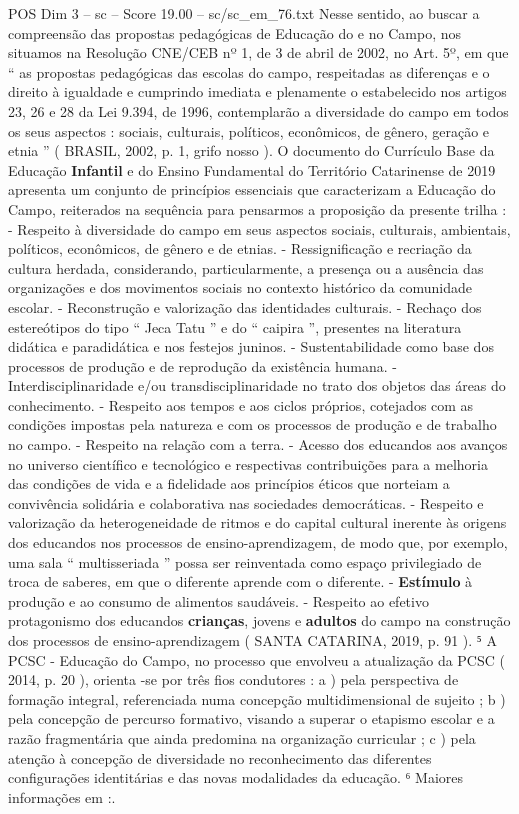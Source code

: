 \begin{textsample}{POS Dim 3 – sc – Score 19.00 – sc/sc\_em\_76.txt}
Nesse sentido, ao buscar a compreensão das propostas pedagógicas de Educação do e no Campo, nos situamos na Resolução CNE/CEB nº 1, de 3 de abril de 2002, no Art. 5º, em que “ as propostas pedagógicas das escolas do campo, respeitadas as diferenças e o direito à igualdade e cumprindo imediata e plenamente o estabelecido nos artigos 23, 26 e 28 da Lei 9.394, de 1996, contemplarão a diversidade do campo em todos os seus aspectos : sociais, culturais, políticos, econômicos, de gênero, geração e etnia ” ( BRASIL, 2002, p. 1, grifo nosso ).
O documento do Currículo Base da Educação \textbf{Infantil} e do Ensino Fundamental do Território Catarinense de 2019 apresenta um conjunto de princípios essenciais que caracterizam a Educação do Campo, reiterados na sequência para pensarmos a proposição da presente trilha : - Respeito à diversidade do campo em seus aspectos sociais, culturais, ambientais, políticos, econômicos, de gênero e de etnias. - Ressignificação e recriação da cultura herdada, considerando, particularmente, a presença ou a ausência das organizações e dos movimentos sociais no contexto histórico da comunidade escolar. - Reconstrução e valorização das identidades culturais. - Rechaço dos estereótipos do tipo “ Jeca Tatu ” e do “ caipira ”, presentes na literatura didática e paradidática e nos festejos juninos. - Sustentabilidade como base dos processos de produção e de reprodução da existência humana. - Interdisciplinaridade e/ou transdisciplinaridade no trato dos objetos das áreas do conhecimento. - Respeito aos tempos e aos ciclos próprios, cotejados com as condições impostas pela natureza e com os processos de produção e de trabalho no campo. - Respeito na relação com a terra. - Acesso dos educandos aos avanços no universo científico e tecnológico e respectivas contribuições para a melhoria das condições de vida e a fidelidade aos princípios éticos que norteiam a convivência solidária e colaborativa nas sociedades democráticas. - Respeito e valorização da heterogeneidade de ritmos e do capital cultural inerente às origens dos educandos nos processos de ensino-aprendizagem, de modo que, por exemplo, uma sala “ multisseriada ” possa ser reinventada como espaço privilegiado de troca de saberes, em que o diferente aprende com o diferente. - \textbf{Estímulo} à produção e ao consumo de alimentos saudáveis. - Respeito ao efetivo protagonismo dos educandos \textbf{crianças}, jovens e \textbf{adultos} do campo na construção dos processos de ensino-aprendizagem ( SANTA CATARINA, 2019, p. 91 ). ⁵ A PCSC - Educação do Campo, no processo que envolveu a atualização da PCSC ( 2014, p. 20 ), orienta -se por três fios condutores : a ) pela perspectiva de formação integral, referenciada numa concepção multidimensional de sujeito ; b ) pela concepção de percurso formativo, visando a superar o etapismo escolar e a razão fragmentária que ainda predomina na organização curricular ; c ) pela atenção à concepção de diversidade no reconhecimento das diferentes configurações identitárias e das novas modalidades da educação. ⁶ Maiores informações em :.

\end{textsample}
